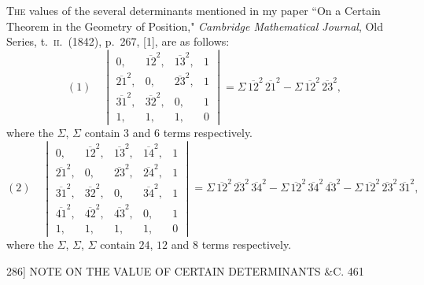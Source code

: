 \documentclass[11pt]{article}
\begin{document}
\textsc{The} values of the several determinants mentioned in my paper ``On a Certain
Theorem in the Geometry of Position," \textit{Cambridge Mathematical Journal}, Old Series,
t.~\textsc{ii}.\ (1842), p.~267, [1], are as follows:
\[ (1)\quad \begin{vmatrix}
0, & \overline{12}^{2}, & \overline{13}^{2}, & 1 \\
\overline{21}^{2}, & 0, & \overline{23}^{2}, & 1 \\
\overline{31}^{2}, & \overline{32}^{2}, & 0, & 1 \\
1, & 1, & 1, & 0
\end{vmatrix} = \Sigma\, \overline{12}^{2}\, \overline{21}^{2} - \Sigma\, \overline{12}^{2}\, \overline{23}^{2}, \]
where the $\Sigma$, $\Sigma$ contain $3$ and $6$ terms respectively.
\[ (2)\quad \begin{vmatrix}
0, & \overline{12}^{2}, & \overline{13}^{2}, & \overline{14}^{2}, & 1 \\
\overline{21}^{2}, & 0, & \overline{23}^{2}, & \overline{24}^{2}, & 1 \\
\overline{31}^{2}, & \overline{32}^{2}, & 0, & \overline{34}^{2}, & 1 \\
\overline{41}^{2}, & \overline{42}^{2}, & \overline{43}^{2}, & 0, & 1 \\
1, & 1, & 1, & 1, & 0
\end{vmatrix} = \Sigma\, \overline{12}^{2}\, \overline{23}^{2}\, \overline{34}^{2}
- \Sigma\, \overline{12}^{2}\, \overline{34}^{2}\, \overline{43}^{2}
- \Sigma\, \overline{12}^{2}\, \overline{23}^{2}\, \overline{31}^{2}, \]
where the $\Sigma$, $\Sigma$, $\Sigma$ contain $24$, $12$ and $8$ terms respectively.

\begin{center}
\textsc{286]} \hfill NOTE ON THE VALUE OF CERTAIN DETERMINANTS \&C. \hfill 461
\end{center}
\end{document}
